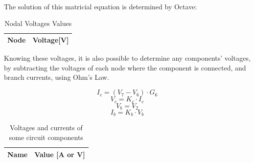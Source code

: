 The solution of this matricial equation is determined by Octave:

\begin{table}[H]
  \centering
  \begin{tabular}{|l|r|}
    \hline    
    {\bf Node} & {\bf Voltage[V]} \\ \hline
    
  \end{tabular}
  \caption{Nodal Voltages Values}
  \label{tab:nodal}
\end{table}

Knowing these voltages, it is also possible to determine any components' voltages, by subtracting the voltages of each node where the component is connected, and branch currents, using Ohm’s Law.

\begin{equation}
  I_c=(V_7-V_6)\cdot G_6
\end{equation}
\begin{equation}
  V_c=K_c\cdot I_c
\end{equation}
\begin{equation}
  V_b=V_2
\end{equation}
\begin{equation}
  I_b=K_b\cdot V_b
 \end{equation}
 
 \begin{table}[H]
  \centering
  \begin{tabular}{|l|r|}
    \hline    
    {\bf Name} & {\bf Value [A or V]} \\ \hline
    
  \end{tabular}
  \caption{Voltages and currents of some circuit components}
  \label{tab:valn}
\end{table}
